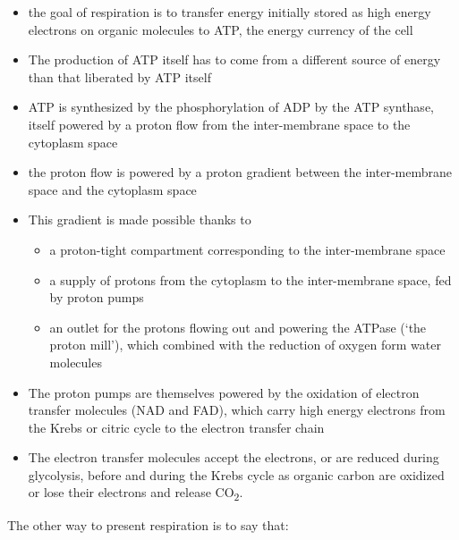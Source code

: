 \documentclass[]{book}
\providecommand{\tightlist}{%
  \setlength{\itemsep}{0pt}\setlength{\parskip}{0pt}}
\theoremstyle{definition}
\theoremstyle{definition}
\theoremstyle{definition}
\theoremstyle{remark}
\begin{document}
\begin{itemize}
\tightlist
\item
  the goal of respiration is to transfer energy initially stored as high
  energy electrons on organic molecules to ATP, the energy currency of
  the cell
\item
  The production of ATP itself has to come from a different source of
  energy than that liberated by ATP itself
\item
  ATP is synthesized by the phosphorylation of ADP by the ATP synthase,
  itself powered by a proton flow from the inter-membrane space to the
  cytoplasm space
\item
  the proton flow is powered by a proton gradient between the
  inter-membrane space and the cytoplasm space
\item
  This gradient is made possible thanks to

  \begin{itemize}
  \tightlist
  \item
    a proton-tight compartment corresponding to the inter-membrane space
  \item
    a supply of protons from the cytoplasm to the inter-membrane space,
    fed by proton pumps
  \item
    an outlet for the protons flowing out and powering the ATPase (`the
    proton mill'), which combined with the reduction of oxygen form
    water molecules
  \end{itemize}
\item
  The proton pumps are themselves powered by the oxidation of electron
  transfer molecules (NAD and FAD), which carry high energy electrons
  from the Krebs or citric cycle to the electron transfer chain
\item
  The electron transfer molecules accept the electrons, or are reduced
  during glycolysis, before and during the Krebs cycle as organic carbon
  are oxidized or lose their electrons and release CO\textsubscript{2}.
\end{itemize}

The other way to present respiration is to say that:
\end{document}
